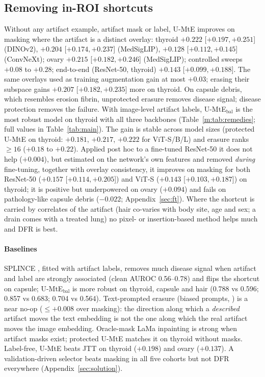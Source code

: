 \documentclass{article}
\begin{document}
\subsection{Removing in-ROI shortcuts}

Without any artifact example, artifact mask or label, U-MtE improves on masking where the artifact is a distinct overlay:
thyroid $+0.222$ [$+0.197, +0.251$] (DINOv2), $+0.204$ [$+0.174, +0.237$] (MedSigLIP), $+0.128$ [$+0.112, +0.145$]
(ConvNeXt); ovary $+0.215$ [$+0.182, +0.246$] (MedSigLIP); controlled sweeps $+0.08$ to $+0.28$; end-to-end
(ResNet-50, thyroid) $+0.143$ [$+0.099, +0.188$]. The same overlays used as training augmentation gain at most
$+0.03$; erasing their subspace gains $+0.207$ [$+0.182, +0.235$] more on thyroid. On capsule debris, which resembles
erosion fibrin, unprotected erasure removes disease signal; disease protection removes the failure. With image-level
artifact labels, U-MtE$_{\text{bal}}$ is the most robust model on thyroid with all three backbones
(Table~\ref{m:tab:remedies}; full values in Table~\ref{tab:main}).
The gain is stable across model sizes (protected U-MtE on thyroid: $+0.181$, $+0.217$, $+0.222$ for ViT-S/B/L) and
erasure ranks $\ge16$ ($+0.18$ to $+0.22$). Applied post hoc to a fine-tuned ResNet-50 it does not help ($+0.004$),
but estimated on the network's own features and removed \emph{during} fine-tuning, together with overlay consistency,
it improves on masking for both ResNet-50 ($+0.157$ [$+0.114, +0.205$]) and ViT-S ($+0.143$ [$+0.103, +0.187$]) on
thyroid; it is positive but underpowered on ovary ($+0.094$) and fails on pathology-like capsule debris ($-0.022$;
Appendix~\ref{sec:ft}).
Where the shortcut is carried by correlates of the artifact (hair co-varies with body site, age and sex; a drain comes
with a treated lung) no pixel- or insertion-based method helps much and DFR \citep{kirichenko2023dfr} is best.

\paragraph{Baselines} SPLINCE \citep{splice2025}, fitted with artifact labels, removes much disease signal when artifact
and label are strongly associated (clean AUROC 0.56--0.78) and flips the shortcut on capsule; U-MtE$_{\text{bal}}$ is
more robust on thyroid, capsule and hair (0.788 vs 0.596; 0.857 vs 0.683; 0.704 vs 0.564). Text-prompted erasure
(biased prompts, \citealp{chuang2023debiasing}) is a near no-op ($\le+0.008$ over masking): the direction along which a
\emph{described} artifact moves the text embedding is not the one along which the real artifact moves the image
embedding. Oracle-mask LaMa inpainting \citep{suvorov2022lama} is strong when artifact masks exist; protected U-MtE
matches it on thyroid without masks. Label-free, U-MtE beats JTT \citep{liu2021jtt} on thyroid ($+0.198$) and ovary
($+0.137$). A validation-driven selector beats masking in all five cohorts but not DFR everywhere (Appendix~\ref{sec:solution}).
\end{document}
